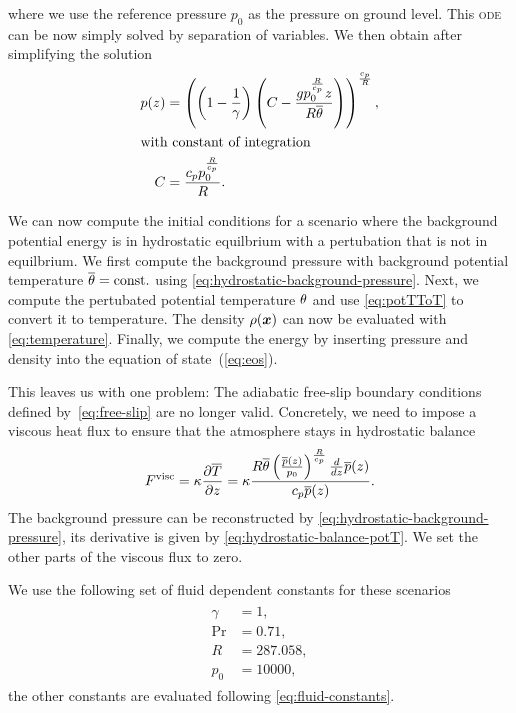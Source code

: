 where we use the reference pressure $p_0$ as the pressure on ground level.
This \textsc{ode} can be now simply solved by separation of variables.
We then obtain after simplifying the solution
\begin{align}
  \label{eq:hydrostatic-background-pressure}
p(z) &= \left(\left(1 - \frac{1}{\gamma}\right) \left(C - \frac{g p_{0}^{\frac{R}{c_{p}}} z}{R \overline{\theta}}\right)\right)^{\frac{c_{p}}{R}},\\
\shortintertext{with constant of integration}
 C &= \frac{c_{p} p_{0}^{\frac{R}{c_{p}}}}{R}.
\end{align}

We can now compute the initial conditions for a scenario where the background potential energy is in hydrostatic equilbrium with a pertubation that is not in equilbrium.
We first compute the background pressure with background potential temperature $\overline{\theta} = \text{const.}$ using \cref{eq:hydrostatic-background-pressure}.
Next, we compute the pertubated potential temperature $\theta$ and use \cref{eq:potTToT} to convert it to temperature.
The density $\rho(\bm{x})$ can now be evaluated with \cref{eq:temperature}.
Finally, we compute the energy by inserting pressure and density into the equation of state~(\ref{eq:eos}).

This leaves us with one problem:
The adiabatic free-slip boundary conditions defined by~\vref{eq:free-slip} are no longer valid.
Concretely, we need to impose a viscous heat flux to ensure that the atmosphere stays in hydrostatic balance~\cite{giraldo2008study}
\begin{equation}
  \label{eq:atmosphere-bc}
  F^\text{visc} = \kappa \pdv{\overline{T}}{z} =
\kappa \frac{R \overline{\theta} \left(\frac{\overline{p}{\left (z \right )}}{p_{0}}\right)^{\frac{R}{c_{p}}} \frac{d}{d z} \overline{p}{\left (z \right )}}{c_{p} \overline{p}{\left (z \right )}}.
\end{equation}
The background pressure can be reconstructed by \cref{eq:hydrostatic-background-pressure}, its derivative is given by \cref{eq:hydrostatic-balance-potT}.
We set the other parts of the viscous flux to zero.

We use the following set of fluid dependent constants for these scenarios
\begin{align}
  \begin{split}
    \gamma &= 1, \\
    \Pr &=  0.71, \\
    R &= 287.058, \\
    p_0 &= 10000,
  \end{split}
\end{align}
the other constants are evaluated following \cref{eq:fluid-constants}.

